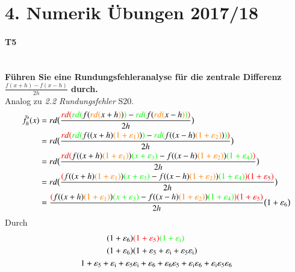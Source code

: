 \documentclass[10pt,a4paper]{article}
\begin{document}
	\section*{4. Numerik Übungen 2017/18}
	\paragraph{T5}\mbox{}\\
	\textbf{Führen Sie eine Rundungsfehleranalyse für die zentrale Differenz $\frac{f(x+h)-f(x-h)}{2h}$ durch.} \\
	Analog zu \emph{2.2 Rundungsfehler} S20.
	\begin{align*}
		\tilde{f}'_h(x) &= rd\bigl(\frac{{
				\color{red}rd(}{\color{green}rd(}f({\color{orange}rd(}x+h{\color{orange})}){\color{green})}
				-{\color{green}rd(}f({\color{orange}rd(}x-h{\color{orange})}{\color{green})}{\color{red})}}
				{2h}\bigr)  \\
			&= rd\bigl(\frac{{
					\color{red}rd(}{\color{green}rd(}f((x+h){\color{orange}(1+\varepsilon_1)}){\color{green})}
				-{\color{green}rd(}f((x-h){\color{orange}(1+\varepsilon_2)}){\color{green})}{\color{red})}}
			{2h}\bigr)  \\
			&= rd\bigl(
				 \frac{
					{\color{red}rd(} f((x+h){\color{orange}(1+\varepsilon_1)}){\color{green}(x+\varepsilon_3)}
					-f((x-h){\color{orange}(1+\varepsilon_2)}){\color{green}(1+\varepsilon_4)}{\color{red})}
				  }
				 {2h}
			    \bigr)  \\
			&= rd\bigl(
			\frac{
				{\color{red}(}f((x+h){\color{orange}(1+\varepsilon_1)}){\color{green}(x+\varepsilon_3)}
				-f((x-h){\color{orange}(1+\varepsilon_2)}){\color{green}(1+\varepsilon_4)}{\color{red})(1+\varepsilon_5)}
			}
			{2h}
			\bigr)  \\
			&= \frac{
				{\color{red}(}f((x+h){\color{orange}(1+\varepsilon_1)}){\color{green}(x+\varepsilon_3)}
				-f((x-h){\color{orange}(1+\varepsilon_2)}){\color{green}(1+\varepsilon_4)}{\color{red})(1+\varepsilon_5)}
			}
			{2h} \bigl(1+\varepsilon_6\bigr)
	\end{align*}
	Durch
	\begin{align*}
		(1+\varepsilon_6)&{\color{red}(1+\varepsilon_5)}{\color{green}(1+\varepsilon_\text{i})} \\
		(1+\varepsilon_6)&(1 + \varepsilon_5+\varepsilon_\text{i}+\varepsilon_5\varepsilon_\text{i})\\
		1 + \varepsilon_5 + \varepsilon_\text{i} + \varepsilon_5& \varepsilon_\text{i} +\varepsilon_6 + \varepsilon_6 \varepsilon_5 + \varepsilon_\text{i} \varepsilon_6 + \varepsilon_\text{i} \varepsilon_5 \varepsilon_6
	\end{align*}
\end{document}
